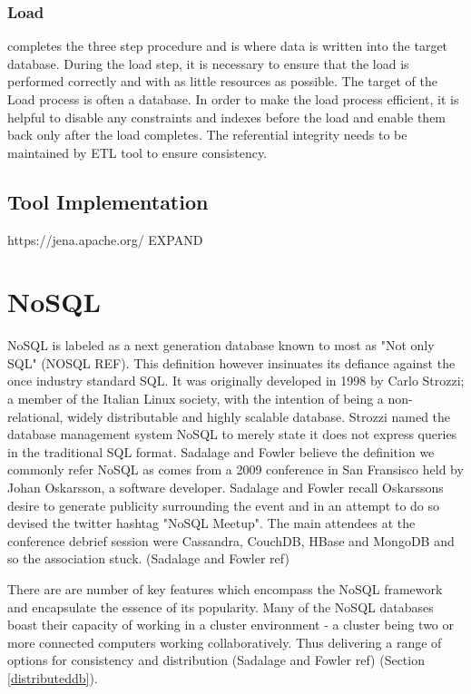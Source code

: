 \subsubsection{Load} completes the three step procedure and is where data is written into the target database. During the load step, it is necessary to ensure that the load is performed correctly and with as little resources as possible. The target of the Load process is often a database. In order to make the load process efficient, it is helpful to disable any constraints and indexes before the load and enable them back only after the load completes. The referential integrity needs to be maintained by ETL tool to ensure consistency.

\subsection{Tool Implementation}
https://jena.apache.org/
EXPAND

\section{NoSQL}
NoSQL is labeled as a next generation database known to most as "Not only SQL" (NOSQL REF). This definition however insinuates its defiance against the once industry standard SQL. It was originally developed in 1998 by Carlo Strozzi; a member of the Italian Linux society, with the intention of being a non-relational, widely distributable and highly scalable database. Strozzi named the database management system NoSQL to merely state it does not express queries in the traditional SQL format. Sadalage and Fowler believe the definition we commonly refer NoSQL as comes from a 2009 conference in San Fransisco held by Johan Oskarsson, a software developer. Sadalage and Fowler recall Oskarssons desire to generate publicity surrounding the event and in an attempt to do so devised the twitter hashtag "NoSQL Meetup". The main attendees at the conference debrief session were Cassandra, CouchDB, HBase and MongoDB and so the association stuck. (Sadalage and Fowler ref)

There are are number of key features which encompass the NoSQL framework and encapsulate the essence of its popularity. Many of the NoSQL databases boast their capacity of working in a cluster environment - a cluster being two or more connected computers working collaboratively. Thus delivering a range of options for consistency and distribution (Sadalage and Fowler ref) (Section \ref{distributeddb}).

